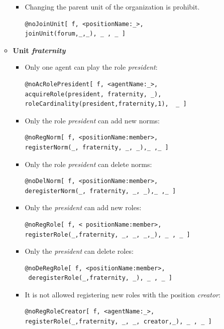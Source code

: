 \begin{enumerate}
\begin{itemize}
\begin{itemize}
\item Changing the parent unit of the organization is prohibit.  
\begin{verbatim}
@noJoinUnit[ f, <positionName:_>, 
joinUnit(forum,_,_), _ , _ ] 
\end{verbatim}

\end{itemize}

\item \textbf{Unit \textit{fraternity}}
\begin{itemize}
\item Only one agent can play the role \textit{president}:
\begin{verbatim}
@noAcRolePresident[ f, <agentName:_>, 
acquireRole(president, fraternity, _),
roleCardinality(president,fraternity,1),  _ ] 
\end{verbatim}

\item Only the role \textit{president} can add new norms:
\begin{verbatim}
@noRegNorm[ f, <positionName:member>, 
registerNorm(_, fraternity, _, _),_ ,_ ] 
\end{verbatim}

\item Only the role \textit{president} can delete norms:
\begin{verbatim}
@noDelNorm[ f, <positionName:member>, 
deregisterNorm(_, fraternity, _, _),_ ,_ ] 
\end{verbatim}

\item Only the  \textit{president} can add new roles:
\begin{verbatim}
@noRegRole[ f, < positionName:member>, 
registerRole(_,fraternity, _, _, _,_), _ , _ ] 
\end{verbatim}

\item Only the  \textit{president} can delete roles:
\begin{verbatim}
@noDeRegRole[ f, <positionName:member>,
 deregisterRole(_,fraternity, _), _ , _ ] 
\end{verbatim}

\item It is not allowed registering new roles with the position \textit{creator}:
\begin{verbatim}
@noRegRoleCreator[ f, <agentName:_>, 
registerRole(_,fraternity, _, _, creator,_), _ , _ ] 
\end{verbatim}



\end{itemize}
\end{itemize}
\end{enumerate}
